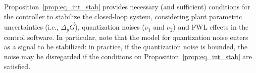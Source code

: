 \documentclass[final]{sig-alternate-05-2015}
\newcommand{\red}[1]{{\color{red}#1}}
\begin{document}
Proposition~\ref{prop:eq_int_stab} provides necessary (and sufficient) conditions for the
controller to stabilize the closed-loop system, considering plant
parametric uncertainties (i.e., $\Delta_p \vec{G}$), quantization noises
($\nu_{1}$ and $\nu_{2}$) and FWL effects in the control software.  
In particular, 
note that the model for quantization noise enters as a signal to be stabilized: 
in practice, 
if the quantization noise is bounded, 
the noise may be disregarded if the conditions on
Proposition~\ref{prop:eq_int_stab} are satisfied.  


 





\end{document}
